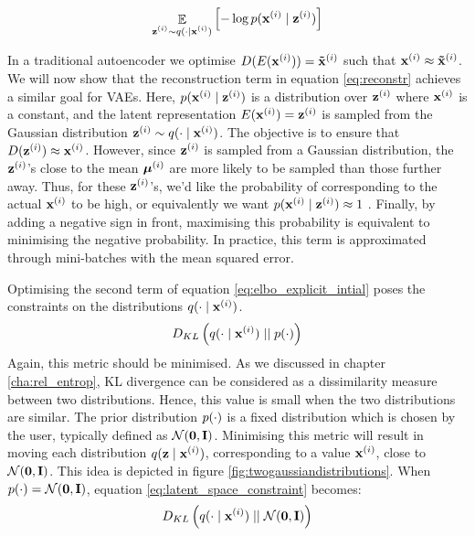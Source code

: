 	\begin{equation}
		\mathop{\mathbb{E}}_{\substack{\mathbf{z}^{(i)} \sim q (\cdot \mid \mathbf{x}^{(i)})}} \left[ -\log p (\mathbf{x}^{(i)} \mid \mathbf{z}^{(i)}) \right] \label{eq:reconstr}	
	\end{equation}

	In a traditional autoencoder we optimise $D(E(\mathbf{x}^{(i)})) = \mathbf{\tilde{x}}^{(i)}$ such that $\mathbf{x}^{(i)} \approx \mathbf{\tilde{x}}^{(i)}$. We will now show that the reconstruction term in equation \ref{eq:reconstr} achieves a similar goal for VAEs. Here, $p (\mathbf{x}^{(i)} \mid \mathbf{z}^{(i)})$ is a distribution over $\mathbf{z}^{(i)}$ where $\mathbf{x}^{(i)}$ is a constant, and the latent representation $E(\mathbf{x}^{(i)}) = \mathbf{z}^{(i)}$ is sampled from the Gaussian distribution $\mathbf{z}^{(i)} \sim q (\cdot \mid \mathbf{x}^{(i)})$. The objective is to ensure that $D(\mathbf{z}^{(i)}) \approx \mathbf{x}^{(i)}$. However, since $\mathbf{z}^{(i)}$ is sampled from a Gaussian distribution, the $\mathbf{z}^{(i)}$'s close to the mean $\bm{\mu}^{(i)}$ are more likely to be sampled than those further away. Thus, for these $\mathbf{z}^{(i)}$'s, we'd like the probability of corresponding to the actual $\mathbf{x}^{(i)}$ to be high, or equivalently we want $p (\mathbf{x}^{(i)} \mid \mathbf{z}^{(i)}) \approx 1$ \citep{cinelliVariationalMethodsMachine2021}. Finally, by adding a negative sign in front, maximising this probability is equivalent to minimising the negative probability. In practice, this term is approximated through mini-batches with the mean squared error. %
	

	Optimising the second term of equation \ref{eq:elbo_explicit_intial} poses the constraints on the distributions $q (\cdot \mid \mathbf{x}^{(i)})$. 
	\begin{equation}
		D_{KL} \left(  q (\cdot \mid \mathbf{x}^{(i)})  \mid \mid  p(\cdot)  \right) \label{eq:latent_space_constraint}		
	\end{equation}
	Again, this metric should be minimised. As we discussed in chapter \ref{cha:rel_entrop}, KL divergence can be considered as a dissimilarity measure between two distributions. Hence, this value is small when the two distributions are similar. The prior distribution $p(\cdot)$ is a fixed distribution which is chosen by the user, typically defined as $\mathcal{N}(\bm{\mathbf{0}}, \mathbf{I})$. Minimising this metric will result in moving each distribution $q (\mathbf{z} \mid \mathbf{x}^{(i)})$, corresponding to a value $\mathbf{x}^{(i)}$, close to $\mathcal{N}(\bm{\mathbf{0}}, \mathbf{I})$. This idea is depicted in figure \ref{fig:twogaussiandistributions}. When $p(\cdot) = \mathcal{N}(\bm{\mathbf{0}}, \mathbf{I})$, equation \ref{eq:latent_space_constraint} becomes:
	$$D_{KL} \left(  q (\cdot \mid \mathbf{x}^{(i)})  \mid \mid  \mathcal{N}(\bm{\mathbf{0}}, \mathbf{I})  \right)$$
	
